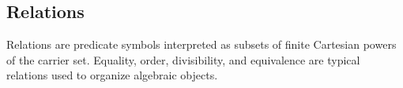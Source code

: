 \subsection*{Relations}
\label{subsec:structure-relations}

\begin{remark*}[Exposition]
Relations are predicate symbols interpreted as subsets of finite Cartesian
powers of the carrier set.  Equality, order, divisibility, and equivalence are
typical relations used to organize algebraic objects.
\end{remark*}
